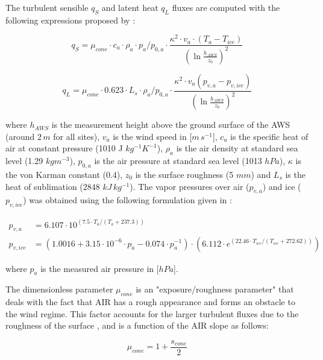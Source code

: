 \documentclass[utf8]{frontiersSCNS} %
\begin{document}
The turbulent sensible $q_{S}$ and latent heat $q_{L}$ fluxes are computed with the following expressions proposed by
\cite{Garratt_1992}:

\begin{equation} q_{S}=\mu_{cone}\cdot c_{a} \cdot \rho_{a} \cdot p_{a}/p_{0,a} \cdot \frac{\kappa^2 \cdot v_a \cdot
		(T_a-T_{ice})}{{(\ln{\frac{h_{AWS}}{z_{0}}})}^2} \label{eqn:qs} \end{equation}

\begin{equation} q_{L}=\mu_{cone}\cdot 0.623 \cdot L_s \cdot \rho_{a}/p_{0,a} \cdot \frac{\kappa^2 \cdot
	v_a(p_{v,a}-p_{v,ice})}{{(\ln{\frac{h_{AWS}}{z_{0}}})}^2} \end{equation}

where $h_{AWS}$ is the measurement height above the ground surface of the AWS (around $2\,m$ for all sites), $v_a$ is
the wind speed in [$m\,s^{-1}$], $c_a$ is the specific heat of air at constant pressure (1010 J $kg^{-1} K^{-1}$),
$\rho_{a}$ is the air density at standard sea level (1.29 $kg m^{-3}$), $p_{0,a}$ is the air pressure at standard sea
level (1013 $hPa$), $\kappa$ is the von Karman constant (0.4), $z_{0}$ is the surface roughness (5 $mm$) and $L_s$ is the heat of sublimation (2848 $kJ\,kg^{-1}$).
The vapor pressures over air ($p_{v,a}$) and ice ($p_{v,ice}$) was obtained using the following formulation given in
\cite{WMO_2018}:

\begin{equation} \begin{split} p_{v,a}&=6.107 \cdot 10^{(7.5 \cdot T_a / (T_a + 237.3))}\\ p_{v,ice}&=(1.0016 +
		3.15\cdot10^{-6}\cdot p_{a}-0.074\cdot p_{a}^{-1})\cdot(6.112 \cdot e^{(22.46 \cdot T_{ice} / (T_{ice} + 272.62))})
	\end{split} \label{eqn:vp} \end{equation}

where $p_{a}$ is the measured air pressure in [$hPa$].

The dimensionless parameter $\mu_{cone}$ is an "exposure/roughness parameter" that deals with the fact that AIR has a
rough appearance and forms an obstacle to the wind regime. This factor accounts for the larger turbulent fluxes due to
the roughness of the surface \cite{Oerlemans_2021}, and is a function of the AIR slope as follows:

\begin{equation}
	\mu_{cone} = 1 + \frac{s_{cone}}{2}
\end{equation}
\end{document}
